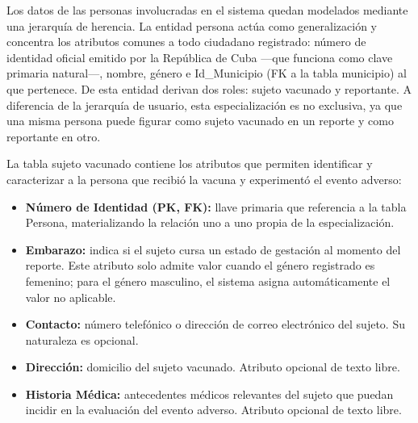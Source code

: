 Los datos de las personas involucradas en el sistema quedan modelados mediante una jerarquía de herencia.
La entidad persona actúa como generalización y concentra los atributos comunes a todo ciudadano registrado: número de identidad oficial emitido por la República de Cuba —que funciona como clave primaria natural—, nombre, género e Id\_Municipio (FK a la tabla municipio) al que pertenece.
De esta entidad derivan dos roles: sujeto vacunado y reportante. A diferencia de la jerarquía de usuario, esta especialización es no exclusiva, ya que una misma persona puede figurar como sujeto vacunado en un reporte y como reportante en otro.

La tabla sujeto vacunado contiene los atributos que permiten identificar y caracterizar a la persona que recibió la vacuna y experimentó el evento adverso:

\begin{itemize}
    \item \textbf{Número de Identidad (PK, FK):} llave primaria que referencia a la tabla Persona, materializando la relación uno a uno propia de la especialización.
    \item \textbf{Embarazo:} indica si el sujeto cursa un estado de gestación al momento del reporte. Este atributo solo admite valor cuando el género registrado es femenino; para el género masculino, el sistema asigna automáticamente el valor no aplicable.   
    \item \textbf{Contacto:} número telefónico o dirección de correo electrónico del sujeto. Su naturaleza es opcional.
    \item \textbf{Dirección:} domicilio del sujeto vacunado. Atributo opcional de texto libre.
    \item \textbf{Historia Médica:} antecedentes médicos relevantes del sujeto que puedan incidir en la evaluación del evento adverso. Atributo opcional de texto libre.
\end{itemize}


